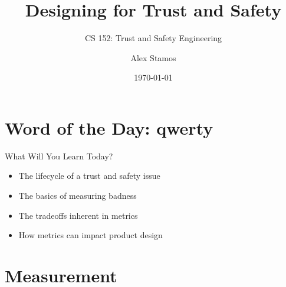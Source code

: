 \documentclass[nobackground,dvipsnames,table]{beamer}
\title{Designing for Trust and Safety}
\subtitle{CS 152: Trust and Safety Engineering}
\author[A. Stamos]{Alex Stamos}
\institute[SIO]{\large Stanford Internet Observatory}
\date[2022]{\today}
\begin{document}
\coverpage

\begin{frame}
    \titlepage
\end{frame}

\section{Word of the Day: qwerty}

\begin{frame}{What Will You Learn Today?}
    \begin{itemize}
        \item The lifecycle of a trust and safety issue
        \item The basics of measuring badness
        \item The tradeoffs inherent in metrics
        \item How metrics can impact product design
    \end{itemize}
\end{frame}

\section{Measurement}
\end{document}
